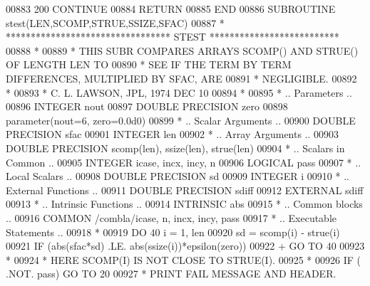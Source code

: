 \begin{DoxyCode}
00883   200 \textcolor{keywordflow}{CONTINUE}
00884       \textcolor{keywordflow}{RETURN}
00885 \textcolor{keyword}{      END}
00886 \textcolor{keyword}{      SUBROUTINE }stest(LEN,SCOMP,STRUE,SSIZE,SFAC)
00887 \textcolor{comment}{*     ********************************* STEST **************************}
00888 \textcolor{comment}{*}
00889 \textcolor{comment}{*     THIS SUBR COMPARES ARRAYS  SCOMP() AND STRUE() OF LENGTH LEN TO}
00890 \textcolor{comment}{*     SEE IF THE TERM BY TERM DIFFERENCES, MULTIPLIED BY SFAC, ARE}
00891 \textcolor{comment}{*     NEGLIGIBLE.}
00892 \textcolor{comment}{*}
00893 \textcolor{comment}{*     C. L. LAWSON, JPL, 1974 DEC 10}
00894 \textcolor{comment}{*}
00895 \textcolor{comment}{*     .. Parameters ..}
00896       \textcolor{keywordtype}{INTEGER}          nout
00897       \textcolor{keywordtype}{DOUBLE PRECISION} zero
00898       parameter(nout=6, zero=0.0d0)
00899 \textcolor{comment}{*     .. Scalar Arguments ..}
00900       \textcolor{keywordtype}{DOUBLE PRECISION} sfac
00901       \textcolor{keywordtype}{INTEGER}          len
00902 \textcolor{comment}{*     .. Array Arguments ..}
00903       \textcolor{keywordtype}{DOUBLE PRECISION} scomp(len), ssize(len), strue(len)
00904 \textcolor{comment}{*     .. Scalars in Common ..}
00905       \textcolor{keywordtype}{INTEGER}          icase, incx, incy, n
00906       \textcolor{keywordtype}{LOGICAL}          pass
00907 \textcolor{comment}{*     .. Local Scalars ..}
00908       \textcolor{keywordtype}{DOUBLE PRECISION} sd
00909       \textcolor{keywordtype}{INTEGER}          i
00910 \textcolor{comment}{*     .. External Functions ..}
00911       \textcolor{keywordtype}{DOUBLE PRECISION} sdiff
00912       \textcolor{keywordtype}{EXTERNAL}         sdiff
00913 \textcolor{comment}{*     .. Intrinsic Functions ..}
00914       \textcolor{keywordtype}{INTRINSIC}        abs
00915 \textcolor{comment}{*     .. Common blocks ..}
00916       \textcolor{keyword}{COMMON}           /combla/icase, n, incx, incy, pass
00917 \textcolor{comment}{*     .. Executable Statements ..}
00918 \textcolor{comment}{*}
00919       \textcolor{keywordflow}{DO} 40 i = 1, len
00920          sd = scomp(i) - strue(i)
00921          \textcolor{keywordflow}{IF} (abs(sfac*sd) .LE. abs(ssize(i))*epsilon(zero))
00922      +       \textcolor{keywordflow}{GO TO} 40
00923 \textcolor{comment}{*}
00924 \textcolor{comment}{*                             HERE    SCOMP(I) IS NOT CLOSE TO STRUE(I).}
00925 \textcolor{comment}{*}
00926          \textcolor{keywordflow}{IF} ( .NOT. pass) \textcolor{keywordflow}{GO TO} 20
00927 \textcolor{comment}{*                             PRINT FAIL MESSAGE AND HEADER.}

\end{DoxyCode}
